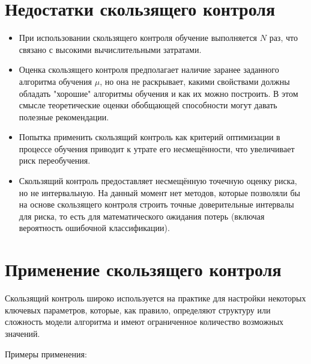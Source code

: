 \section{Недостатки скользящего контроля}
\begin{itemize}
    \item При использовании скользящего контроля обучение выполняется \( N \) раз, что связано с высокими вычислительными затратами.
    \item Оценка скользящего контроля предполагает наличие заранее заданного алгоритма обучения \( \mu \), но она не раскрывает, какими свойствами должны обладать "хорошие" алгоритмы обучения и как их можно построить. В этом смысле теоретические оценки обобщающей способности могут давать полезные рекомендации.

    \item Попытка применить скользящий контроль как критерий оптимизации в процессе обучения приводит к утрате его несмещённости, что увеличивает риск переобучения.
    \item Скользящий контроль предоставляет несмещённую точечную оценку риска, но не интервальную. На данный момент нет методов, которые позволяли бы на основе скользящего контроля строить точные доверительные интервалы для риска, то есть для математического ожидания потерь (включая вероятность ошибочной классификации).
\end{itemize}

\section{Применение скользящего контроля}

Скользящий контроль широко используется на практике для настройки некоторых ключевых параметров, которые, как правило, определяют структуру или сложность модели алгоритма и имеют ограниченное количество возможных значений.

Примеры применения:

